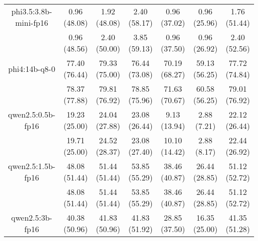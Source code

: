 \begin{table}[]
{\begin{tabular}{ccccccc}
      \multicolumn{1}{c|}{phi3.5:3.8b-mini-fp16} & 0.96 (48.08) & 1.92 (48.08) & \multicolumn{1}{c|}{2.40 (58.17)} & 0.96 (37.02) & \multicolumn{1}{c|}{0.96 (25.96)} & 1.76 (51.44) \\



      \multicolumn{1}{c|}{} & 0.96 (48.56) & 2.40 (50.00) & \multicolumn{1}{c|}{3.85 (59.13)} & 0.96 (37.50) & \multicolumn{1}{c|}{0.96 (26.92)} & 2.40 (52.56) \\
      \cline{1-7}


      \multicolumn{1}{c|}{phi4:14b-q8-0} & 77.40 (76.44) & 79.33 (75.00) & \multicolumn{1}{c|}{76.44 (73.08)} & 70.19 (68.27) & \multicolumn{1}{c|}{59.13 (56.25)} & 77.72 (74.84) \\



      \multicolumn{1}{c|}{} & 78.37 (77.88) & 79.81 (76.92) & \multicolumn{1}{c|}{78.85 (75.96)} & 71.63 (70.67) & \multicolumn{1}{c|}{60.58 (56.25)} & 79.01 (76.92) \\
      \cline{1-7}


      \multicolumn{1}{c|}{qwen2.5:0.5b-fp16} & 19.23 (25.00) & 24.04 (27.88) & \multicolumn{1}{c|}{23.08 (26.44)} & 9.13 (13.94) & \multicolumn{1}{c|}{2.88 (7.21)} & 22.12 (26.44) \\



      \multicolumn{1}{c|}{} & 19.71 (25.00) & 24.52 (28.37) & \multicolumn{1}{c|}{23.08 (27.40)} & 10.10 (14.42) & \multicolumn{1}{c|}{2.88 (8.17)} & 22.44 (26.92) \\
      \cline{1-7}


      \multicolumn{1}{c|}{qwen2.5:1.5b-fp16} & 48.08 (51.44) & 51.44 (51.44) & \multicolumn{1}{c|}{53.85 (55.29)} & 38.46 (40.87) & \multicolumn{1}{c|}{26.44 (28.85)} & 51.12 (52.72) \\



      \multicolumn{1}{c|}{} & 48.08 (51.44) & 51.44 (51.44) & \multicolumn{1}{c|}{53.85 (55.29)} & 38.46 (40.87) & \multicolumn{1}{c|}{26.44 (28.85)} & 51.12 (52.72) \\
      \cline{1-7}


      \multicolumn{1}{c|}{qwen2.5:3b-fp16} & 40.38 (50.96) & 41.83 (50.96) & \multicolumn{1}{c|}{41.83 (51.92)} & 28.85 (37.50) & \multicolumn{1}{c|}{16.35 (25.00)} & 41.35 (51.28) \\




\end{tabular}}
\end{table}
